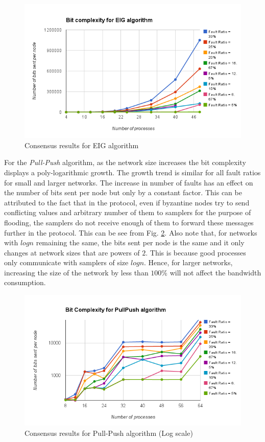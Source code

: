 \begin{figure}[ht]
 \centering
\includegraphics[scale=0.4]{eignolog}
\caption{Consensus results for EIG algorithm}
 \label{fig:eignolog}
\end{figure}
For the \textit{Pull-Push} algorithm, as the network size increases the bit complexity displays a poly-logarithmic growth. The growth trend is similar for all fault ratios for small and larger networks. The increase in number of faults has an effect on the number of bits sent per node but only by a constant factor. This can be attributed to the fact that in the protocol, even if byzantine nodes try to send conflicting values and arbitrary number of them to samplers for the purpose of flooding, the samplers do not receive enough of them to forward these messages further in the protocol. This can be see from Fig. \ref{fig:pull_push}. Also note that, for networks with $logn$ remaining the same, the bits sent per node is the same and it only changes at network sizes that are powers of $2$. This is because good processes only communicate with samplers of size $logn$. Hence, for larger networks, increasing the size of the network by less than $100\%$ will not affect the bandwidth consumption.
\begin{figure}[ht]
 \centering
\includegraphics[scale=0.4]{pull_push}
\caption{Consensus results for Pull-Push algorithm (Log scale)}
 \label{fig:pull_push}
\end{figure}

